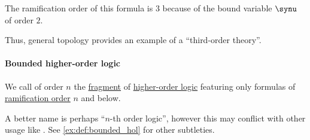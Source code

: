 \begin{example}
\begin{thmenum}
    The ramification order of this formula is \( 3 \) because of the bound variable \( \synu \) of order \( 2 \).

    Thus, general topology provides an example of a \enquote{third-order theory}.
  \end{thmenum}
\end{example}

\paragraph{Bounded higher-order logic}

\begin{definition}\label{def:bounded_hol}\mimprovised
  We call  of order \( n \) the \hyperref[con:syntax_fragment]{fragment} of \hyperref[def:higher_order_logic]{higher-order logic} featuring only formulas of \hyperref[def:hol_formula_ramification_order]{ramification order} \( n \) and below.
\end{definition}
\begin{comments}
  \item A better name is perhaps \enquote{\( n \)-th order logic}, however this may conflict with other usage like . See \cref{ex:def:bounded_hol} for other subtleties.
\end{comments}

